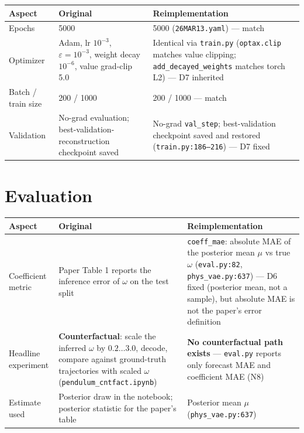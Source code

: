 \documentclass[11pt,a4paper]{article}
\newcommand{\code}[1]{\texttt{#1}}
\begin{document}
\begin{table}[h]
\centering
\small
\begin{tabularx}{\textwidth}{LXX}
\toprule
\textbf{Aspect} & \textbf{Original} & \textbf{Reimplementation} \\
\midrule
Epochs & 5000 & 5000 (\code{26MAR13.yaml}) --- match \\
Optimizer & Adam, lr $10^{-3}$, $\varepsilon = 10^{-3}$, weight decay $10^{-6}$, value grad-clip 5.0 & Identical via \code{train.py} (\code{optax.clip} matches value clipping; \code{add\_decayed\_weights} matches torch L2) --- D7 inherited \\
Batch / train size & 200 / 1000 & 200 / 1000 --- match \\
Validation & No-grad evaluation; best-validation-reconstruction checkpoint saved & No-grad \code{val\_step}; best-validation checkpoint saved and restored (\code{train.py:186--216}) --- D7 fixed \\
\bottomrule
\end{tabularx}
\end{table}

\section{Evaluation}
\label{sec:eval}

\begin{table}[h]
\centering
\small
\begin{tabularx}{\textwidth}{LXX}
\toprule
\textbf{Aspect} & \textbf{Original} & \textbf{Reimplementation} \\
\midrule
Coefficient metric & Paper Table 1 reports the inference error of $\omega$ on the test split & \code{coeff\_mae}: absolute MAE of the posterior mean $\mu$ vs true $\omega$ (\code{eval.py:82}, \code{phys\_vae.py:637}) --- D6 fixed (posterior mean, not a sample), but absolute MAE is not the paper's error definition \\
Headline experiment & \textbf{Counterfactual}: scale the inferred $\omega$ by $0.2 \ldots 3.0$, decode, compare against ground-truth trajectories with scaled $\omega$ (\code{pendulum\_cntfact.ipynb}) & \textbf{No counterfactual path exists} --- \code{eval.py} reports only forecast MAE and coefficient MAE (N8) \\
Estimate used & Posterior draw in the notebook; posterior statistic for the paper's table & Posterior mean $\mu$ (\code{phys\_vae.py:637}) \\
\bottomrule
\end{tabularx}
\end{table}
\end{document}
